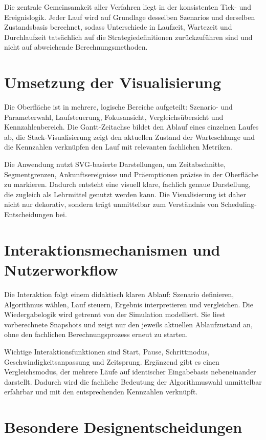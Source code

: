 Die zentrale Gemeinsamkeit aller Verfahren liegt in der konsistenten Tick- und Ereignislogik. Jeder Lauf wird auf Grundlage desselben Szenarios und derselben Zustandsbasis berechnet, sodass Unterschiede in Laufzeit, Wartezeit und Durchlaufzeit tatsächlich auf die Strategiedefinitionen zurückzuführen sind und nicht auf abweichende Berechnungsmethoden.

\section{Umsetzung der Visualisierung}

Die Oberfläche ist in mehrere, logische Bereiche aufgeteilt: Szenario- und Parameterwahl, Laufsteuerung, Fokusansicht, Vergleichsübersicht und Kennzahlenbereich. Die Gantt-Zeitachse bildet den Ablauf eines einzelnen Laufes ab, die Stack-Visualisierung zeigt den aktuellen Zustand der Warteschlange und die Kennzahlen verknüpfen den Lauf mit relevanten fachlichen Metriken.

Die Anwendung nutzt SVG-basierte Darstellungen, um Zeitabschnitte, Segmentgrenzen, Ankunftsereignisse und Präemptionen präzise in der Oberfläche zu markieren. Dadurch entsteht eine visuell klare, fachlich genaue Darstellung, die zugleich als Lehrmittel genutzt werden kann. Die Visualisierung ist daher nicht nur dekorativ, sondern trägt unmittelbar zum Verständnis von Scheduling-Entscheidungen bei.

\section{Interaktionsmechanismen und Nutzerworkflow}

Die Interaktion folgt einem didaktisch klaren Ablauf: Szenario definieren, Algorithmus wählen, Lauf steuern, Ergebnis interpretieren und vergleichen. Die Wiedergabelogik wird getrennt von der Simulation modelliert. Sie liest vorberechnete Snapshots und zeigt nur den jeweils aktuellen Ablaufzustand an, ohne den fachlichen Berechnungsprozess erneut zu starten.

Wichtige Interaktionsfunktionen sind Start, Pause, Schrittmodus, Geschwindigkeitsanpassung und Zeitsprung. Ergänzend gibt es einen Vergleichsmodus, der mehrere Läufe auf identischer Eingabebasis nebeneinander darstellt. Dadurch wird die fachliche Bedeutung der Algorithmuswahl unmittelbar erfahrbar und mit den entsprechenden Kennzahlen verknüpft.

\section{Besondere Designentscheidungen}

